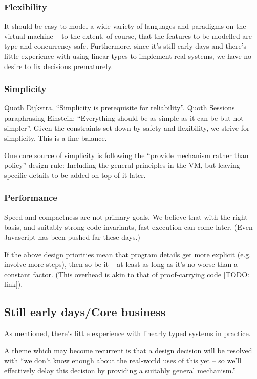 \documentclass[a4paper]{book}
\begin{document}
\subsubsection*{Flexibility}
It should be easy to model a wide variety of languages and paradigms on the
virtual machine -- to the extent, of course, that the features to be modelled
are type and concurrency safe.
Furthermore, since it's still early days and there's little
experience with using linear types to implement real systems,
we have no desire to fix decisions prematurely.

\subsubsection*{Simplicity}
Quoth Dijkstra, ``Simplicity is prerequisite for reliability''.
Quoth Sessions paraphrasing Einstein: ``Everything should be as
simple as it can be but not simpler''.
Given the constraints set down by safety and flexibility, we strive
for simplicity. This is a fine balance.

One core source of simplicity is following the ``provide mechanism
rather than policy'' design rule: Including the general principles in
the VM, but leaving specific details to be added on top of it later.

\subsubsection*{Performance}
Speed and compactness are not primary goals. We believe that with the
right basis, and suitably strong code invariants, fast execution can
come later. (Even Javascript has been pushed far these days.)

If the above design priorities mean that program details get more explicit
(e.g. involve more steps),
then so be it -- at least as long as it's no worse than a constant factor.
(This overhead is akin to that of proof-carrying code [TODO: link]).


\subsection{Still early days/Core business}
As mentioned, there's little experience with linearly typed systems in
practice.

A theme which may become recurrent is that a design decision will be
resolved with ``we don't know enough about the real-world uses of this
yet -- so we'll effectively delay this decision by providing a suitably
general mechanism.''
\end{document}
